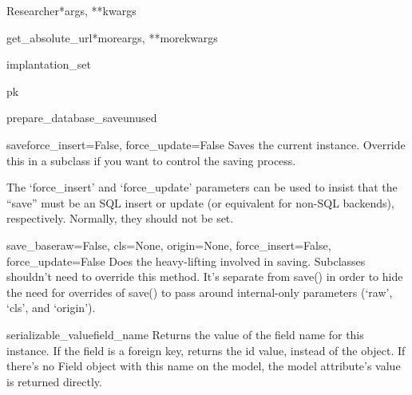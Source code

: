 \documentclass[letterpaper,10pt,english]{sphinxmanual}
\begin{document}
\begin{classdesc}{Researcher}{*args, **kwargs}
\hypertarget{data.models.Researcher.get_absolute_url}{}\begin{methoddesc}[Researcher]{get\_absolute\_url}{*moreargs, **morekwargs}\end{methoddesc}

\hypertarget{data.models.Researcher.implantation_set}{}\begin{memberdesc}[Researcher]{implantation\_set}\end{memberdesc}

\hypertarget{data.models.Researcher.pk}{}\begin{memberdesc}[Researcher]{pk}\end{memberdesc}

\hypertarget{data.models.Researcher.prepare_database_save}{}\begin{methoddesc}[Researcher]{prepare\_database\_save}{unused}\end{methoddesc}

\hypertarget{data.models.Researcher.save}{}\begin{methoddesc}[Researcher]{save}{force\_insert=False, force\_update=False}
Saves the current instance. Override this in a subclass if you want to
control the saving process.

The `force\_insert' and `force\_update' parameters can be used to insist
that the ``save'' must be an SQL insert or update (or equivalent for
non-SQL backends), respectively. Normally, they should not be set.
\end{methoddesc}

\hypertarget{data.models.Researcher.save_base}{}\begin{methoddesc}[Researcher]{save\_base}{raw=False, cls=None, origin=None, force\_insert=False, force\_update=False}
Does the heavy-lifting involved in saving. Subclasses shouldn't need to
override this method. It's separate from save() in order to hide the
need for overrides of save() to pass around internal-only parameters
(`raw', `cls', and `origin').
\end{methoddesc}

\hypertarget{data.models.Researcher.serializable_value}{}\begin{methoddesc}[Researcher]{serializable\_value}{field\_name}
Returns the value of the field name for this instance. If the field is
a foreign key, returns the id value, instead of the object. If there's
no Field object with this name on the model, the model attribute's
value is returned directly.


\end{methoddesc}
\end{classdesc}
\end{document}
